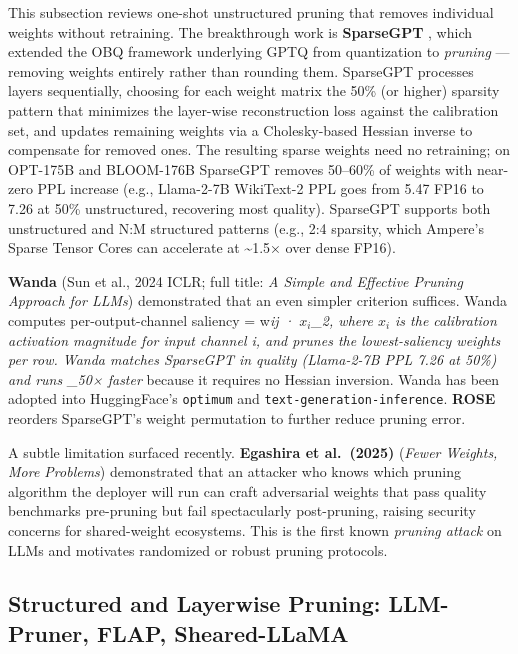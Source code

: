 \documentclass{article}
\begin{document}
This subsection reviews one-shot unstructured pruning that removes individual weights without retraining. The breakthrough work is \textbf{SparseGPT} \citep{frantar2023gptqaccurateposttr}, which extended the OBQ framework underlying GPTQ from quantization to \emph{pruning} --- removing weights entirely rather than rounding them. SparseGPT processes layers sequentially, choosing for each weight matrix the 50\% (or higher) sparsity pattern that minimizes the layer-wise reconstruction loss against the calibration set, and updates remaining weights via a Cholesky-based Hessian inverse to compensate for removed ones. The resulting sparse weights need no retraining; on OPT-175B and BLOOM-176B SparseGPT removes 50--60\% of weights with near-zero PPL increase (e.g., Llama-2-7B WikiText-2 PPL goes from 5.47 FP16 to 7.26 at 50\% unstructured, recovering most quality). SparseGPT supports both unstructured and N:M structured patterns (e.g., 2:4 sparsity, which Ampere's Sparse Tensor Cores can accelerate at \textasciitilde1.5× over dense FP16).

\textbf{Wanda} (Sun et al., 2024 ICLR; full title: \emph{A Simple and Effective Pruning Approach for LLMs}) demonstrated that an even simpler criterion suffices. Wanda computes per-output-channel saliency = \textbar w\emph{ij\textbar{} · \textbar\textbar{}\(x_i\)\textbar\textbar\_2, where \(x_i\) is the calibration activation magnitude for input channel i, and prunes the lowest-saliency weights per row. Wanda matches SparseGPT in quality (Llama-2-7B PPL 7.26 at 50\%) and runs \_50× faster} because it requires no Hessian inversion. Wanda has been adopted into HuggingFace's \texttt{optimum} and \texttt{text-generation-inference}. \textbf{ROSE} \citep{su2026rosereorderedspars} reorders SparseGPT's weight permutation to further reduce pruning error.

A subtle limitation surfaced recently. \textbf{Egashira et al.~(2025)} (\emph{Fewer Weights, More Problems}) demonstrated that an attacker who knows which pruning algorithm the deployer will run can craft adversarial weights that pass quality benchmarks pre-pruning but fail spectacularly post-pruning, raising security concerns for shared-weight ecosystems. This is the first known \emph{pruning attack} on LLMs and motivates randomized or robust pruning protocols.

\subsection{Structured and Layerwise Pruning: LLM-Pruner, FLAP, Sheared-LLaMA}\label{structured-and-layerwise-pruning-llm-pruner-flap-sheared-llama}
\end{document}
